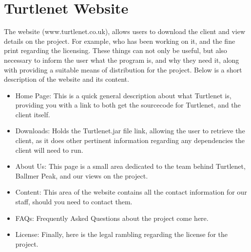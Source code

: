 \section{Turtlenet Website}

The website (www.turtlenet.co.uk), allows users to download the client and view 
details on the project. For example, who has been working on it, and the fine 
print regarding the licensing. These things can not only be useful, but also 
necessary to inform the user what the program is, and why they need it, along 
with providing a suitable means of distribution for the project. Below is a 
short description of the website and its content.


\begin{itemize}
\item Home Page: This is a quick general description about what Turtlenet is, 
providing you with a link to both get the sourcecode for Turtlenet, and the 
client itself.
\item Downloads: Holds the Turtlenet.jar file link, allowing the user to retrieve
the client, as it does other pertinent information regarding any dependencies the
client will need to run.
\item About Us: This page is a small area dedicated to the team behind Turtlenet, 
Ballmer Peak, and our views on the project.
\item Content: This area of the website contains all the contact information for 
our staff, should you need to contact them.
\item FAQs: Frequently Asked Questions about the project come here.
\item License: Finally, here is the legal rambling regarding the license for the 
project.
\end{itemize}